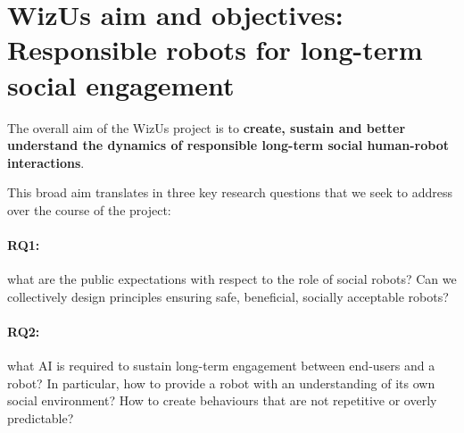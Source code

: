 \documentclass[11pt,a4paper]{report}
\newcommand{\project}{WizUs\xspace}
\begin{document}

\section{\project aim and objectives: Responsible robots for long-term social engagement}




%
%

The overall aim of the \project project is to \textbf{create, sustain and better
understand the dynamics of responsible long-term social human-robot
interactions}.

This broad aim translates in three key research questions that we seek to
address over the course of the project:

\paragraph{\bf RQ1:} what are the public expectations with respect to the role of social
        robots? Can we collectively design principles ensuring safe, beneficial, socially
        acceptable robots? 

\paragraph{\bf RQ2:} what AI is required to sustain long-term engagement between end-users
        and a robot? In particular, how to provide a robot with an understanding
        of its own social environment? How to create behaviours that are not
        repetitive or overly predictable?
\end{document}
